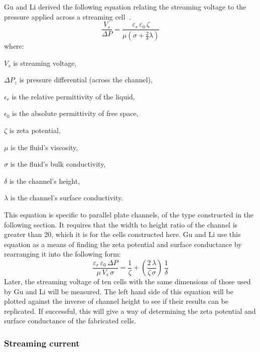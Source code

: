       Gu and Li derived the following equation relating the streaming voltage to the pressure applied across a streaming cell~\cite{Gu2000}.
      \begin{equation}
      \frac{V_{s}}{\Delta P} = \frac{\varepsilon_{r}\,\varepsilon_{0}\,\zeta}{\mu(\sigma+\frac{2}{\delta}\lambda)}
      \label{eq:part1_energyHarvesting_streamingVoltage}
      \end{equation}
      \noindent where:
      \begin{description}
          \item $V_{s}$ is streaming voltage,
          \item $\Delta P_{z}$ is pressure differential (across the channel),
          \item $\epsilon_{r}$ is the relative permittivity of the liquid,
          \item $\epsilon_{0}$ is the absolute permittivity of free space,
          \item $\zeta$ is zeta potential,
          \item $\mu$ is the fluid's viscosity,
          \item $\sigma$ is the fluid's bulk conductivity,
          \item $\delta$ is the channel's height,
          \item $\lambda$ is the channel's surface conductivity.
      \end{description}
      This equation is specific to parallel plate channels, of the type constructed in the following section.
      It requires that the width to height ratio of the channel is greater than 20, which it is for the cells constructed here.
      Gu and Li use this equation as a means of finding the zeta potential and surface conductance by rearranging it into the following form:
      \begin{equation}
        \frac{\varepsilon_{r}\, \varepsilon_{0}\, \Delta P}{\mu\, V_{s}\, \sigma} = \frac{1}{\zeta} + \left(\frac{2\, \lambda}{\zeta\, \sigma}\right)\, \frac{1}{\delta}
      \end{equation}
      Later, the streaming voltage of ten cells with the same dimensions of those used by Gu and Li will be measured.
      The left hand side of this equation will be plotted against the inverse of channel height to see if their results can be replicated.
      If successful, this will give a way of determining the zeta potential and surface conductance of the fabricated cells.


    \subsubsection*{Streaming current}


